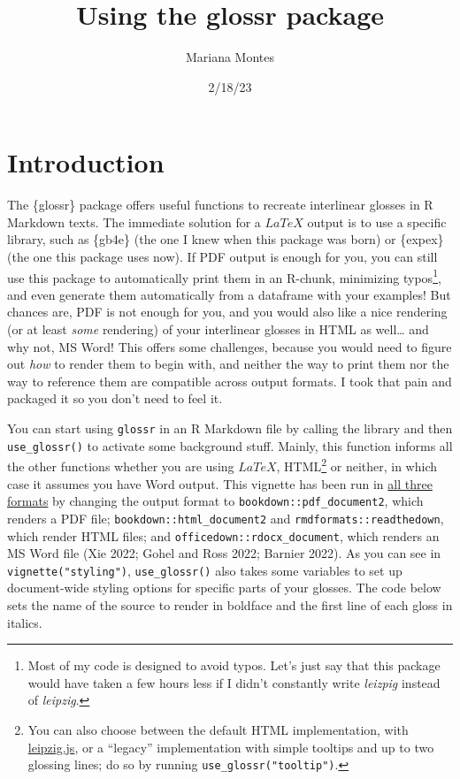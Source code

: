 \documentclass[
  letterpaper,
  DIV=11,
  numbers=noendperiod]{scrartcl}
\title{Using the glossr package}
\author{Mariana Montes}
\date{2/18/23}
\begin{document}
\maketitle
\ifdefined\Shaded\renewenvironment{Shaded}{\begin{tcolorbox}[boxrule=0pt, frame hidden, borderline west={3pt}{0pt}{shadecolor}, sharp corners, enhanced, breakable, interior hidden]}{\end{tcolorbox}}\fi

\hypertarget{introduction}{%
\section{Introduction}\label{introduction}}

The \{glossr\} package offers useful functions to recreate interlinear
glosses in R Markdown texts. The immediate solution for a \(LaTeX\)
output is to use a specific library, such as \{gb4e\} (the one I knew
when this package was born) or \{expex\} (the one this package uses
now). If PDF output is enough for you, you can still use this package to
automatically print them in an R-chunk, minimizing typos\footnote{Most
  of my code is designed to avoid typos. Let's just say that this
  package would have taken a few hours less if I didn't constantly write
  \emph{leizpig} instead of \emph{leipzig}.}, and even generate them
automatically from a dataframe with your examples! But chances are, PDF
is not enough for you, and you would also like a nice rendering (or at
least \emph{some} rendering) of your interlinear glosses in HTML as
well\ldots{} and why not, MS Word! This offers some challenges, because
you would need to figure out \emph{how} to render them to begin with,
and neither the way to print them nor the way to reference them are
compatible across output formats. I took that pain and packaged it so
you don't need to feel it.

You can start using \texttt{glossr} in an R Markdown file by calling the
library and then \texttt{use\_glossr()} to activate some background
stuff. Mainly, this function informs all the other functions whether you
are using \(LaTeX\), HTML\footnote{You can also choose between the
  default HTML implementation, with
  \href{https://github.com/bdchauvette/leipzig.js/}{leipzig.js}, or a
  ``legacy'' implementation with simple tooltips and up to two glossing
  lines; do so by running \texttt{use\_glossr("tooltip")}.} or neither,
in which case it assumes you have Word output. This vignette has been
run in
\href{https://github.com/montesmariana/glossr/tree/main/inst/examples}{all
three formats} by changing the output format to
\texttt{bookdown::pdf\_document2}, which renders a PDF file;
\texttt{bookdown::html\_document2} and \texttt{rmdformats::readthedown},
which render HTML files; and \texttt{officedown::rdocx\_document}, which
renders an MS Word file (Xie 2022; Gohel and Ross 2022; Barnier 2022).
As you can see in \texttt{vignette("styling")}, \texttt{use\_glossr()}
also takes some variables to set up document-wide styling options for
specific parts of your glosses. The code below sets the name of the
source to render in boldface and the first line of each gloss in
italics.
\end{document}

